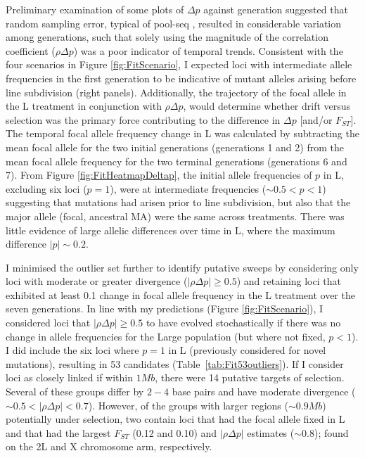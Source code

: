 Preliminary examination of some plots of $\Delta p$ against generation suggested that random sampling error, typical of pool-seq \citep{Gaut13}, resulted in considerable variation among generations, such that solely using the magnitude of the correlation coefficient ($\rho\Delta p$) was a poor indicator of temporal trends. Consistent with the four scenarios in Figure \ref{fig:FitScenario}, I expected loci with intermediate allele frequencies in the first generation to be indicative of mutant alleles arising before line subdivision (right panels). Additionally, the trajectory of the focal allele in the L treatment in conjunction with $\rho\Delta p$, would determine whether drift versus selection was the primary force contributing to the difference in $\Delta p$ [and/or $F_{ST}$]. The temporal focal allele frequency change in L was calculated by subtracting the mean focal allele for the two initial generations (generations 1 and 2) from the mean focal allele frequency for the two terminal generations (generations 6 and 7). From Figure \ref{fig:FitHeatmapDeltap}, the initial allele frequencies of $p$ in L, excluding six loci ($p = 1$), were at intermediate frequencies ($\sim 0.5 < p < 1$) suggesting that mutations had arisen prior to line subdivision, but also that the major allele (focal, ancestral MA) were the same across treatments. There was little evidence of large allelic differences over time in L, where the maximum difference $|p| \sim 0.2$.\par 

I minimised the outlier set further to identify putative sweeps by considering only loci with moderate or greater divergence ($|\rho\Delta p| \geq 0.5$) and retaining loci that exhibited at least 0.1 change in focal allele frequency in the L treatment over the seven generations. In line with my predictions (Figure \ref{fig:FitScenario}), I considered loci that $|\rho\Delta p| \geq 0.5$ to have evolved stochastically if there was no change in allele frequencies for the Large population (but where not fixed, $p<1$). I did include the six loci where $p = 1$ in L (previously considered for novel mutations), resulting in 53 candidates (Table~\ref{tab:Fit53outliers}). If I consider loci as closely linked if within $1Mb$, there were 14 putative targets of selection. Several of these groups differ by $2-4$ base pairs and have moderate divergence ($\sim 0.5 < |\rho\Delta p| < 0.7$). However, of the groups with larger regions ($\sim0.9Mb$) potentially under selection, two contain loci that had the focal allele fixed in L and that had the largest $F_{ST}$ (0.12 and 0.10) and $|\rho\Delta p|$ estimates ($\sim0.8$); found on the 2L and X chromosome arm, respectively. \par

